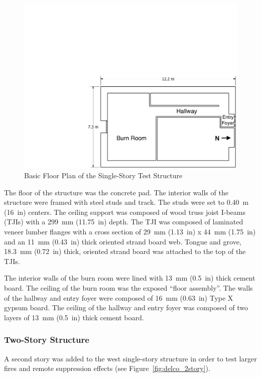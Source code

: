 \documentclass[12pt,oneside]{book}
\begin{document}
\begin{figure}[!ht]
	\includegraphics[width=\columnwidth]{../Figures/Floor_Plans/PDFs/East_Structure/DelCo_2012_East_Structure_Plain}
	\caption{Basic Floor Plan of the Single-Story Test Structure}
	\label{fig:Test_Structure_Floor_Plan}
\end{figure}

The floor of the structure was the concrete pad. The interior walls of the structure were framed with steel studs and track. The studs were set to 0.40~m (16~in) centers. The ceiling support was composed of wood truss joist I-beams (TJIs) with a 299~mm (11.75~in) depth. The TJI was composed of laminated veneer lumber flanges with a cross section of 29~mm (1.13~in) x 44~mm (1.75~in) and an 11~mm (0.43~in) thick oriented strand board web. Tongue and grove, 18.3~mm (0.72~in) thick, oriented strand board was attached to the top of the TJIs.

The interior walls of the burn room were lined with 13~mm (0.5~in) thick cement board. The ceiling of the burn room was the exposed ``floor assembly''. The walls of the hallway and entry foyer were composed of 16~mm (0.63~in) Type X gypsum board. The ceiling of the hallway and entry foyer was composed of two layers of 13~mm (0.5~in) thick cement board.

\subsubsection*{Two-Story Structure}

A second story was added to the west single-story structure in order to test larger fires and remote suppression effects (see Figure~\ref{fig:delco_2story}).
\end{document}
